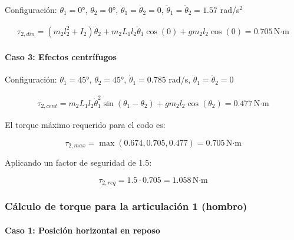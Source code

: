 Configuración: $\theta_1 = 0°$, $\theta_2 = 0°$, $\dot{\theta}_1 = \dot{\theta}_2 = 0$, $\ddot{\theta}_1 = \ddot{\theta}_2 = 1.57$ rad/s$^2$

\begin{multline}
\tau_{2,din} = (m_2l_2^2 + I_2)\ddot{\theta}_2 + m_2L_1l_2\ddot{\theta}_1\cos(0) + gm_2l_2\cos(0)
= 0.705 \, \text{N·m}
\end{multline}

\paragraph{Caso 3: Efectos centrífugos}

Configuración: $\theta_1 = 45°$, $\theta_2 = 45°$, $\dot{\theta}_1 = 0.785$ rad/s, $\ddot{\theta}_1 = \ddot{\theta}_2 = 0$

\begin{multline}
\tau_{2,cent} = m_2L_1l_2\dot{\theta}_1^2\sin(\theta_1 - \theta_2) + gm_2l_2\cos(\theta_2) 
= 0.477 \, \text{N·m}
\end{multline}

El torque máximo requerido para el codo es:

\begin{equation}
\tau_{2,max} = \max(0.674, 0.705, 0.477) = 0.705 \, \text{N·m}
\end{equation}

Aplicando un factor de seguridad de 1.5:

\begin{equation}
\tau_{2,req} = 1.5 \cdot 0.705 = 1.058 \, \text{N·m}
\end{equation}

\subsubsection{Cálculo de torque para la articulación 1 (hombro)}

\paragraph{Caso 1: Posición horizontal en reposo}

